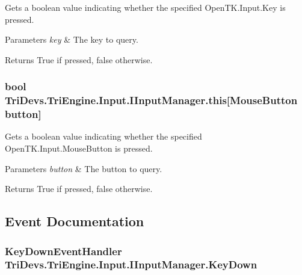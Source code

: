 Gets a boolean value indicating whether the specified Open\-T\-K.\-Input.\-Key is pressed. 


\begin{DoxyParams}{Parameters}
{\em key} & The key to query.\\
\hline
\end{DoxyParams}
\begin{DoxyReturn}{Returns}
True if pressed, false otherwise.
\end{DoxyReturn}
\hypertarget{interface_tri_devs_1_1_tri_engine_1_1_input_1_1_i_input_manager_ad35176c53bff7945cfb07a801f5d67c5}{
\subsubsection[{this[Mouse\-Button button]}]{\setlength{\rightskip}{0pt plus 5cm}bool Tri\-Devs.\-Tri\-Engine.\-Input.\-I\-Input\-Manager.\-this\mbox{[}Mouse\-Button button\mbox{]}\hspace{0.3cm}{\ttfamily [get]}}}\label{interface_tri_devs_1_1_tri_engine_1_1_input_1_1_i_input_manager_ad35176c53bff7945cfb07a801f5d67c5}


Gets a boolean value indicating whether the specified Open\-T\-K.\-Input.\-Mouse\-Button is pressed. 


\begin{DoxyParams}{Parameters}
{\em button} & The button to query.\\
\hline
\end{DoxyParams}
\begin{DoxyReturn}{Returns}
True if pressed, false otherwise.
\end{DoxyReturn}


\subsection{Event Documentation}
\hypertarget{interface_tri_devs_1_1_tri_engine_1_1_input_1_1_i_input_manager_a99f5fc3c551b90a6195354eb10107fae}{
\subsubsection[{Key\-Down}]{\setlength{\rightskip}{0pt plus 5cm}Key\-Down\-Event\-Handler Tri\-Devs.\-Tri\-Engine.\-Input.\-I\-Input\-Manager.\-Key\-Down}}\label{interface_tri_devs_1_1_tri_engine_1_1_input_1_1_i_input_manager_a99f5fc3c551b90a6195354eb10107fae}


